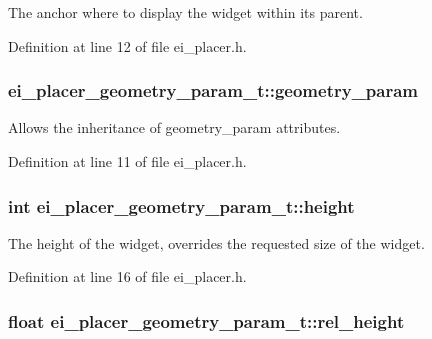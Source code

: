 The anchor where to display the widget within its parent. 



Definition at line 12 of file ei\+\_\+placer.\+h.

\hypertarget{structei__placer__geometry__param__t_ac4fbf1c623a149e51297d6bad1550ff2}{
\subsubsection[{geometry\+\_\+param}]{ ei\+\_\+placer\+\_\+geometry\+\_\+param\+\_\+t\+::geometry\+\_\+param}}\label{structei__placer__geometry__param__t_ac4fbf1c623a149e51297d6bad1550ff2}


Allows the inheritance of geometry\+\_\+param attributes. 



Definition at line 11 of file ei\+\_\+placer.\+h.

\hypertarget{structei__placer__geometry__param__t_a618ac597262e097151de37f8388e2b67}{
\subsubsection[{height}]{\setlength{\rightskip}{0pt plus 5cm}int ei\+\_\+placer\+\_\+geometry\+\_\+param\+\_\+t\+::height}}\label{structei__placer__geometry__param__t_a618ac597262e097151de37f8388e2b67}


The height of the widget, overrides the requested size of the widget. 



Definition at line 16 of file ei\+\_\+placer.\+h.

\hypertarget{structei__placer__geometry__param__t_aa2a20632f767399e71b3c4ce25ab756a}{
\subsubsection[{rel\+\_\+height}]{\setlength{\rightskip}{0pt plus 5cm}float ei\+\_\+placer\+\_\+geometry\+\_\+param\+\_\+t\+::rel\+\_\+height}}\label{structei__placer__geometry__param__t_aa2a20632f767399e71b3c4ce25ab756a}


